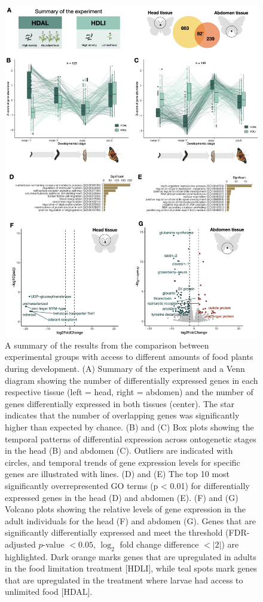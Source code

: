 \documentclass[lineno]{wiley-article}
\begin{document}
\begin{figure}[bt]
\includegraphics[width=12cm]{‎Vanessa_RNAseq_Figures2_FIG3.‎001.jpeg}
\caption{A summary of the results from the comparison between experimental groups with access to different amounts of food plants during development. (A) Summary of the experiment and a Venn diagram showing the number of differentially expressed genes in each respective tissue (left = head, right = abdomen) and the number of genes differentially expressed in both tissues (center). The star indicates that the number of overlapping genes was significantly higher than expected by chance. (B) and (C) Box plots showing the temporal patterns of differential expression across ontogenetic stages in the head (B) and abdomen (C). Outliers are indicated with circles, and temporal trends of gene expression levels for specific genes are illustrated with lines. (D) and (E) The top 10 most significantly overrepresented GO terms (p < 0.01) for differentially expressed genes in the head (D) and abdomen (E). (F) and (G) Volcano plots showing the relative levels of gene expression in the adult individuals for the head (F) and abdomen (G). Genes that are significantly differentially expressed and meet the threshold (FDR-adjusted \( p \)-value \( < 0.05 \), \(\log_2\) fold change difference \( < |2| \)) are highlighted. Dark orange marks genes that are upregulated in adults in the food limitation treatment [HDLI], while teal spots mark genes that are upregulated in the treatment where larvae had access to unlimited food [HDAL].}
\end{figure}
\end{document}
